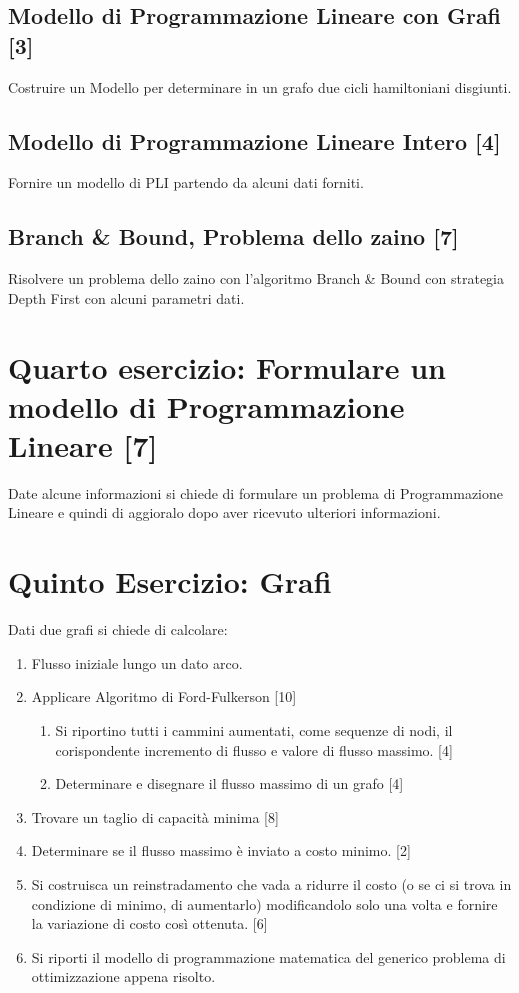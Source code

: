 \documentclass[\main/main.tex]{subfiles}
\begin{document}
\subsection{Modello di Programmazione Lineare con Grafi [3]}
Costruire un Modello per determinare in un grafo due cicli hamiltoniani disgiunti.

\subsection{Modello di Programmazione Lineare Intero [4]}
Fornire un modello di PLI partendo da alcuni dati forniti.

\subsection{Branch \& Bound, Problema dello zaino [7]}
Risolvere un problema dello zaino con l'algoritmo Branch \& Bound con strategia Depth First con alcuni parametri dati.

\section{Quarto esercizio: Formulare un modello di Programmazione Lineare [7]}

Date alcune informazioni si chiede di formulare un problema di Programmazione Lineare e quindi di aggioralo dopo aver ricevuto ulteriori informazioni.

\section{Quinto Esercizio: Grafi}
Dati due grafi si chiede di calcolare:

\begin{enumerate}
  \item Flusso iniziale lungo un dato arco.
  \item Applicare Algoritmo di Ford-Fulkerson [10]
        \begin{enumerate}
          \item Si riportino tutti i cammini aumentati, come sequenze di nodi, il corispondente incremento di flusso e valore di flusso massimo. [4]
          \item Determinare e disegnare il flusso massimo di un grafo [4]
        \end{enumerate}
  \item Trovare un taglio di capacità minima [8]
  \item Determinare se il flusso massimo è inviato a costo minimo. [2]
  \item Si costruisca un reinstradamento che vada a ridurre il costo (o se ci si trova in condizione di minimo, di aumentarlo) modificandolo solo una volta e fornire la variazione di costo così ottenuta. [6]
  \item Si riporti il modello di programmazione matematica del generico problema di ottimizzazione appena risolto.
\end{enumerate}
\end{document}
